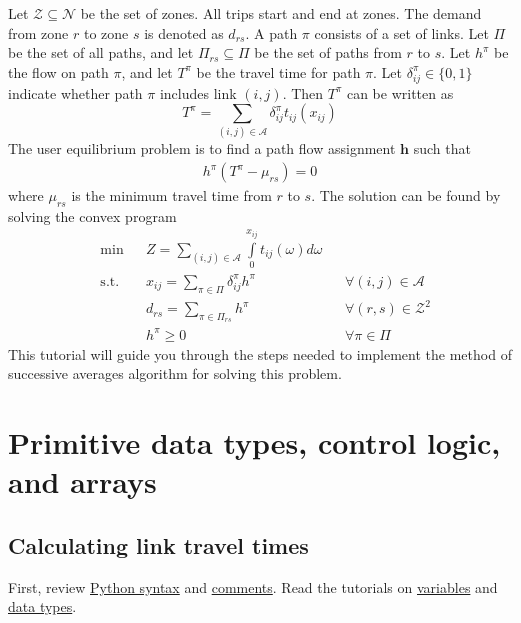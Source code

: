 \documentclass[11pt]{article}
\newcommand{\N}{\mathcal{N}}
\newcommand{\A}{\mathcal{A}}
\newcommand{\Z}{\mathcal{Z}}
\begin{document}
Let $\Z\subseteq\N$ be the set of zones. All trips start and end at zones. The demand from zone $r$ to zone $s$ is denoted as $d_{rs}$. A path $\pi$ consists of a set of links. Let $\Pi$ be the set of all paths, and let $\Pi_{rs}\subseteq\Pi$ be the set of paths from $r$ to $s$. Let $h^\pi$ be the flow on path $\pi$, and let $T^\pi$ be the travel time for path $\pi$. Let $\delta^\pi_{ij}\in\{0,1\}$ indicate whether path $\pi$ includes link $(i,j)$. Then $T^\pi$ can be written as
\begin{equation}
	T^\pi = \sum\limits_{(i,j)\in\A} \delta^\pi_{ij} t_{ij}(x_{ij})
\end{equation}
The user equilibrium problem is to find a path flow assignment $\mathbf{h}$ such that
\begin{align}
	h^\pi \left(T^\pi - \mu_{rs}\right) = 0
\end{align}
where $\mu_{rs}$ is the minimum travel time from $r$ to $s$. The solution can be found by solving the convex program
\begin{subequations}
\begin{align}
	& \min && Z=\sum\limits_{(i,j)\in\A} \int\limits_{0}^{x_{ij}} t_{ij}(\omega) d\omega && \\
	& \mathrm{s.t.} && x_{ij} = \sum\limits_{\pi \in \Pi} \delta^\pi_{ij} h^\pi && \forall (i,j)\in\A\\
	& && d_{rs} = \sum\limits_{\pi\in\Pi_{rs}} h^\pi && \forall (r,s)\in\Z^2\\
	& && h^\pi \geq 0 && \forall \pi\in\Pi 
\end{align}
\end{subequations}
This tutorial will guide you through the steps needed to implement the method of successive averages algorithm for solving this problem.






\section{Primitive data types, control logic, and arrays}

\subsection{Calculating link travel times}
\label{sec21}

First, review \href{https://www.w3schools.com/python/python_syntax.asp}{Python syntax} and \href{https://www.w3schools.com/python/python_comments.asp}{comments}.
Read the tutorials on \href{https://www.w3schools.com/python/python_variables.asp}{variables} and \href{https://www.w3schools.com/python/python_datatypes.asp}{data types}. 
\end{document}
